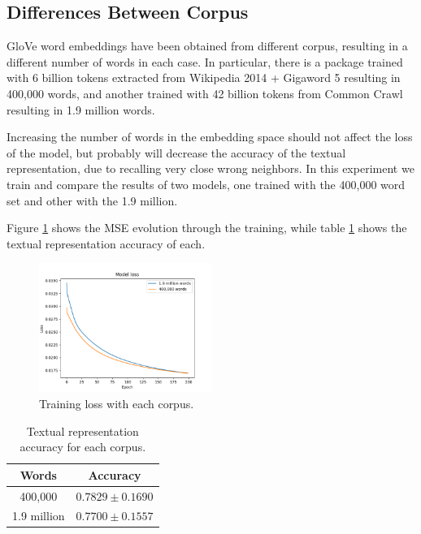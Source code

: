 \documentclass[]{article}
\begin{document}
	\subsection{Differences Between Corpus}
	
	GloVe word embeddings have been obtained from different corpus, resulting in a different number of words in each case. In particular, there is a package trained with 6 billion tokens extracted from Wikipedia 2014 + Gigaword 5 resulting in 400,000 words, and another trained with 42 billion tokens from Common Crawl resulting in 1.9 million words.
	
	Increasing the number of words in the embedding space should not affect the loss of the model, but probably will decrease the accuracy of the textual representation, due to recalling very close wrong neighbors. In this experiment we train and compare the results of two models, one trained with the 400,000 word set and other with the 1.9 million.
	
	Figure \ref{f:corpus} shows the MSE evolution through the training, while table \ref{t:corpus} shows the textual representation accuracy of each.
	
	\begin{figure}[H]
		\centering
		\includegraphics[width=0.5\textwidth]{corpus}
		\caption{Training loss with each corpus.}
		\label{f:corpus}
	\end{figure}
	
	\begin{table}[H]
		\centering
		\begin{tabular}{@{}cc@{}}
			\toprule
			Words       & Accuracy            \\ \midrule
			400,000     & $0.7829 \pm 0.1690$ \\
			1.9 million & $0.7700 \pm 0.1557$ \\ \bottomrule
		\end{tabular}
		\caption{Textual representation accuracy for each corpus.}
		\label{t:corpus}
	\end{table}
	
\end{document}
